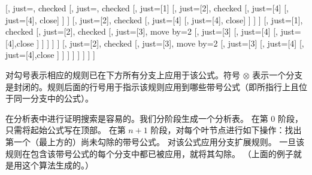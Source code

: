 \documentclass[../../../include/open-logic-section]{subfiles}
\begin{document}
\begin{maxwidth}
  \begin{tableau}{}
  [,
    just=\TAss, checked
    [, just=\TAss, checked
      [, just={\TRule{\True}{\lor}[1]}
        [,
          just={\TRule{\False}{\land}[2]}, checked
          [,
            just={\TRule{\False}{\lor}[4]}
            [,
              just={\TRule{\False}{\lor}[4]}, close]
          ]
        ]
        [,
          just={\TRule{\False}{\land}[2]}, checked
          [,
            just={\TRule{\False}{\lor}[4]}
            [,
              just={\TRule{\False}{\lor}[4]}, close]
          ]
        ]
      ]
      [,
        just={\TRule{\True}{\lor}[1]}, checked
        [,
          just={\TRule{\False}{\land}[2]}, checked
          [,
            just={\TRule{\True}{\land}[3]}, move by=2
            [,
              just={\TRule{\True}{\land}[3]}
              [,
                just={\TRule{\False}{\lor}[4]}
                [,
                  just={\TRule{\False}{\lor}[4]},close
                ]
              ]
            ]
          ]
        ]
        [,
          just={\TRule{\False}{\land}[2]}, checked
          [,
            just={\TRule{\True}{\land}[3]}, move by=2
              [,
                just={\TRule{\True}{\land}[3]}
                [,
                  just={\TRule{\False}{\lor}[4]}
                  [,
                  just={\TRule{\False}{\lor}[4]},close
                ]
              ]
            ]
          ]
        ]
      ]
    ]
  ]
\end{tableau}
\end{maxwidth}

对勾号表示相应的规则已在下方所有分支上应用于该公式。符号 $\otimes$ 表示一个分支是封闭的。规则后面的行号用于指示该规则应用到哪些带号公式（即所指行上且位于同一分支中的公式）。

在分析表中进行证明搜索是容易的。我们分阶段生成一个分析表。
在第 $0$ 阶段，只需将起始公式写在顶部。
在第 $n+1$ 阶段，对每个叶节点进行如下操作：找出第一个（最上方的）尚未勾除的带号公式。
对该公式应用分支扩展规则。
一旦该规则在包含该带号公式的每个分支中都已被应用，就将其勾除。
（上面的例子就是用这个算法生成的。）
\end{document}
